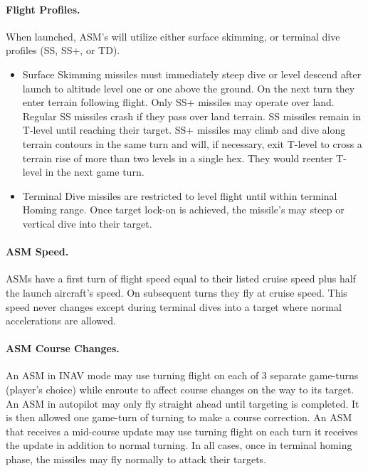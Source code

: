 \begin{advancedrules}
\begin{itemize}
\end{itemize}

\paragraph{Flight Profiles.} When launched, ASM's will utilize either surface skimming, or terminal dive profiles (SS, SS+, or TD).

\begin{itemize}

    \item Surface Skimming missiles must immediately steep dive or level descend after launch to altitude level one or one above the ground. On the next turn they enter terrain following flight. Only SS+ missiles may operate over land. Regular SS missiles crash if they pass over land terrain. SS missiles remain in T-level until reaching their target. SS+ missiles may climb and dive along terrain contours in the same turn and will, if necessary, exit T-level to cross a terrain rise of more than two levels in a single hex. They would reenter T-level in the next game turn.

    \item Terminal Dive missiles are restricted to level flight until within terminal Homing range. Once target lock-on is achieved, the missile's may steep or vertical dive into their target.

\end{itemize}

\paragraph{ASM Speed.} ASMs have a first turn of flight speed equal to their listed cruise speed plus half the launch aircraft's speed. On subsequent turns they fly at cruise speed. This speed never changes except during terminal dives into a target where normal accelerations are allowed.

\paragraph{ASM Course Changes.} An ASM in INAV mode may use turning flight on each of 3 separate game-turns (player's choice) while enroute to affect course changes on the way to its target. An ASM in autopilot may only fly straight ahead until targeting is completed. It is then allowed one game-turn of turning to make a course correction. An ASM that receives a mid-course update may use turning flight on each turn it receives the update in addition to normal turning. In all cases, once in terminal homing phase, the missiles may fly normally to attack their targets.


\end{advancedrules}
